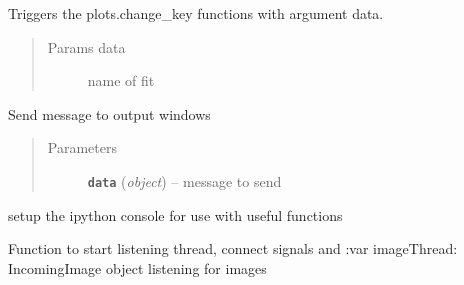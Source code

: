 \documentclass[letterpaper,10pt,english]{sphinxmanual}
\begin{document}
\begin{fulllineitems}
\begin{fulllineitems}
\label{MainWindow:SpinorMonitor.MainWindow.on_fit_name}
Triggers the plots.change\_key functions with argument data.
\begin{quote}\begin{description}
\item[{Params data}] \leavevmode
name of fit

\end{description}\end{quote}

\end{fulllineitems}


\begin{fulllineitems}
\label{MainWindow:SpinorMonitor.MainWindow.on_message}
Send message to output windows
\begin{quote}\begin{description}
\item[{Parameters}] \leavevmode
\textbf{\texttt{data}} (\emph{object}) -- message to send

\end{description}\end{quote}

\end{fulllineitems}


\begin{fulllineitems}
\label{MainWindow:SpinorMonitor.MainWindow.set_up_ipy}
setup the ipython console for use with useful functions

\end{fulllineitems}


\begin{fulllineitems}
\label{MainWindow:SpinorMonitor.MainWindow.start}
Function to start listening thread, connect signals and 
:var imageThread: IncomingImage object listening for images

\end{fulllineitems}



\end{fulllineitems}
\end{document}
